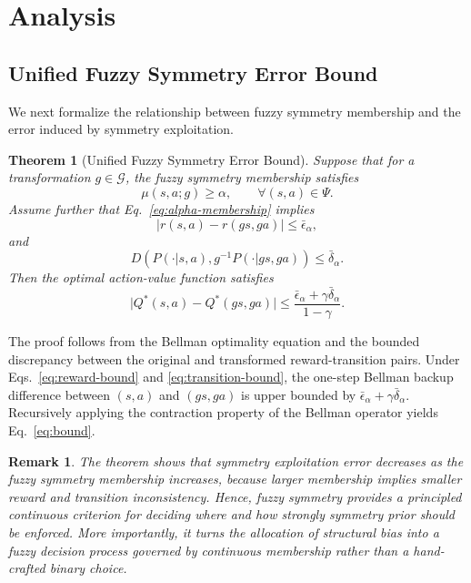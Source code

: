 \documentclass[lettersize,journal]{IEEEtran}
\newtheorem{theorem}{Theorem}
\newtheorem{remark}{Remark}
\newcommand{\Acal}{\mathcal}
\begin{document}
\section{Analysis}
\subsection{Unified Fuzzy Symmetry Error Bound}
We next formalize the relationship between fuzzy symmetry membership and the error induced by symmetry exploitation.

\begin{theorem}[Unified Fuzzy Symmetry Error Bound]
Suppose that for a transformation $g\in\Acal{G}$, the fuzzy symmetry membership satisfies
\begin{equation}
\mu(s,a;g)\ge \alpha,\qquad \forall (s,a)\in\Psi.
\label{eq:alpha-membership}
\end{equation}
Assume further that Eq.~\eqref{eq:alpha-membership} implies
\begin{equation}
|r(s,a)-r(gs,ga)|\le \bar{\epsilon}_{\alpha},
\label{eq:reward-bound}
\end{equation}
and
\begin{equation}
D\!\left(P(\cdot|s,a),g^{-1}P(\cdot|gs,ga)\right)\le \bar{\delta}_{\alpha}.
\label{eq:transition-bound}
\end{equation}
Then the optimal action-value function satisfies
\begin{equation}
\big|Q^*(s,a)-Q^*(gs,ga)\big|
\le
\frac{\bar{\epsilon}_{\alpha}+\gamma \bar{\delta}_{\alpha}}{1-\gamma}.
\label{eq:bound}
\end{equation}
\end{theorem}

\begin{IEEEproof}
The proof follows from the Bellman optimality equation and the bounded discrepancy between the original and transformed reward-transition pairs. Under Eqs.~\eqref{eq:reward-bound} and \eqref{eq:transition-bound}, the one-step Bellman backup difference between $(s,a)$ and $(gs,ga)$ is upper bounded by $\bar{\epsilon}_{\alpha}+\gamma\bar{\delta}_{\alpha}$. Recursively applying the contraction property of the Bellman operator yields Eq.~\eqref{eq:bound}.
\end{IEEEproof}

\begin{remark}
The theorem shows that symmetry exploitation error decreases as the fuzzy symmetry membership increases, because larger membership implies smaller reward and transition inconsistency. Hence, fuzzy symmetry provides a principled continuous criterion for deciding where and how strongly symmetry prior should be enforced. More importantly, it turns the allocation of structural bias into a fuzzy decision process governed by continuous membership rather than a hand-crafted binary choice.
\end{remark}
\end{document}
